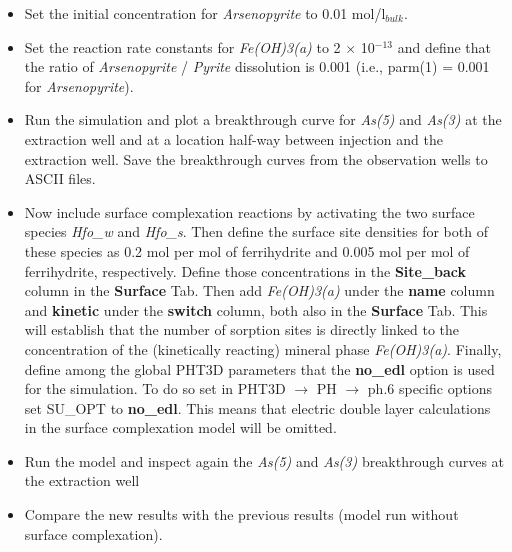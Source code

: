 \begin{itemize}

\item Set the initial concentration for \emph{Arsenopyrite} to 0.01 mol/l$_{bulk}$.

\item Set the reaction rate constants for \emph{Fe(OH)3(a)} to 2 $\times$ 10$^{-13}$
and define that the ratio of \emph{Arsenopyrite} / \emph{Pyrite} dissolution 
is 0.001 (i.e., parm(1) = 0.001 for \emph{Arsenopyrite}).

\item Run the simulation and plot a breakthrough curve for \emph{As(5)} and \emph{As(3)} at the extraction well and at a location half-way between injection and the extraction well.
Save the breakthrough curves from the observation wells to ASCII files.

\item Now include surface complexation reactions by 
activating the two surface species \emph{Hfo\_w} and \emph{Hfo\_s}.
Then define the surface site densities for both of these species as 0.2 mol per mol of ferrihydrite 
and 0.005 mol per mol of ferrihydrite, respectively. Define those concentrations in the {\color{blue} \textbf{Site\_back}} column in the {\color{blue} \textbf{Surface}} Tab. 
Then add \emph{Fe(OH)3(a)} under the {\color{blue} \textbf{name}} 
column and {\color{blue} \textbf{kinetic}} under the {\color{blue} \textbf{switch}} column, 
both also in the {\color{blue} \textbf{Surface}} Tab.  
This will establish that the number of sorption sites is directly 
linked to the concentration of the (kinetically reacting) 
mineral phase \emph{Fe(OH)3(a)}. 
Finally, define among the global PHT3D parameters that the {\color{blue} \textbf{no\_edl}} 
option is used for the simulation.
To do so set in 
{\color{blue}PHT3D} $\rightarrow$ {\color{blue}PH} $\rightarrow$ {\color{blue}ph.6 specific options}
set {\color{red}SU\_OPT} to {\color{blue} \textbf{no\_edl}}. 
This means that electric double layer calculations in the surface complexation 
model will be omitted.  
    

\item Run the model and inspect again the \emph{As(5)} and \emph{As(3)} breakthrough curves at the extraction well

\item Compare the new results with the previous results (model run without surface complexation).

\end{itemize}








